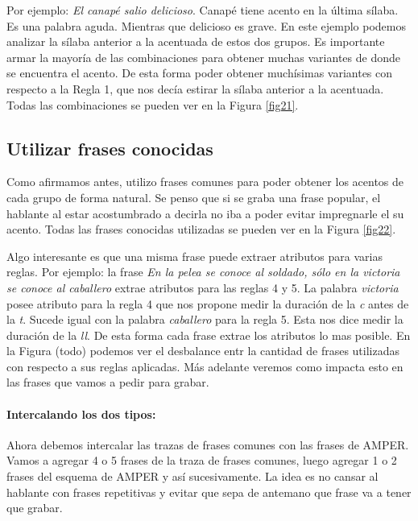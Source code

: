 \documentclass[11pt,a4paper,twoside]{tesis}
\begin{document}
Por ejemplo: \textit{El canapé salio delicioso}. Canapé tiene acento en la última sílaba. Es una palabra aguda. Mientras que delicioso es grave. En este ejemplo podemos analizar la sílaba anterior a la acentuada de estos dos grupos. Es importante armar la mayoría de las combinaciones para obtener muchas variantes de donde se encuentra el acento. De esta forma poder obtener muchísimas variantes con respecto a la Regla 1, que nos decía estirar la sílaba anterior a la acentuada. Todas las combinaciones se pueden ver en la Figura \ref{fig21}.


\subsection{Utilizar frases conocidas}

Como afirmamos antes, utilizo frases comunes para poder obtener los acentos de cada grupo de forma natural. Se penso que si se graba una frase popular, el hablante al estar acostumbrado a decirla no iba a poder evitar impregnarle el su acento. Todas las frases conocidas utilizadas se pueden ver en la Figura \ref{fig22}.

Algo interesante es que una misma frase puede extraer atributos para varias reglas. Por ejemplo: la frase \textit{En la pelea se conoce al soldado, sólo en la victoria se conoce al caballero} extrae atributos para las reglas 4 y 5. La palabra \textit{victoria} posee atributo para la regla 4 que nos propone medir la duración de la \textit{c} antes de la \textit{t}. Sucede igual con la palabra \textit{caballero} para la regla 5. Esta nos dice medir la duración de la \textit{ll}. De esta forma cada frase extrae los atributos lo mas posible. En la Figura (todo) podemos ver el desbalance entr la cantidad de frases utilizadas con respecto a sus reglas aplicadas. Más adelante veremos como impacta esto en las frases que vamos a pedir para grabar.

\paragraph{Intercalando los dos tipos:}

Ahora debemos intercalar las trazas de frases comunes con las frases de AMPER. Vamos a agregar 4 o 5 frases de la traza de frases comunes, luego agregar 1 o 2 frases del esquema de AMPER y así sucesivamente. La idea es no cansar al hablante con frases repetitivas y evitar que sepa de antemano que frase va a tener que grabar.
\end{document}
